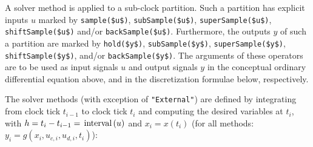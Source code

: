A solver method is applied to a sub-clock partition.
Such a partition has explicit inputs $u$ marked by \lstinline!sample($u$)!, \lstinline!subSample($u$)!, \lstinline!superSample($u$)!, \lstinline!shiftSample($u$)! and/or \lstinline!backSample($u$)!.
Furthermore, the outputs $y$ of such a partition are marked by \lstinline!hold($y$)!, \lstinline!subSample($y$)!, \lstinline!superSample($y$)!, \lstinline!shiftSample($y$)!, and/or \lstinline!backSample($y$)!.
The arguments of these operators are to be used as input signals $u$ and output signals $y$ in the conceptual ordinary differential equation above, and in the discretization formulae below, respectively.

The solver methods (with exception of \lstinline!"External"!) are defined by
integrating from clock tick $t_{i-1}$ to clock tick
$t_{i}$ and computing the desired variables at
$t_{i}$, with $h = t_{i} - t_{i-1} = \text{\lstinline!interval!}(u)$ and
$x_{i} = x(t_{i})$ (for all methods: $y_i = g(x_i,u_{c,i},u_{d,i},t_i)$):
